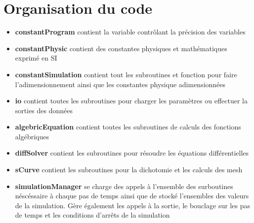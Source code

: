 \documentclass[a4paper,12pt]{article}
\begin{document}
    
\newpage
\section{Organisation du code}

\begin{itemize}
\item \textbf{constantProgram} contient la variable contrôlant la précision des variables
\item \textbf{constantPhysic} contient des constantes physiques et mathématiques exprimé en SI
\item \textbf{constantSimulation} contient tout les subroutines et fonction pour faire l’adimensionnement ainsi que les constantes physique adimensionnées
\item \textbf{io} contient toutes les subroutines pour charger les paramètres ou effectuer la sorties des données
\item \textbf{algebricEquation} contient toutes les subroutines de calculs des fonctions algébriques
\item \textbf{diffSolver} contient les subroutines pour résoudre les équations différentielles
\item \textbf{sCurve} contient les subroutines pour la dichotomie et les calculs des mesh
\item \textbf{simulationManager} se charge des appels à l'ensemble des surboutines néscéssaire à chaque pas de temps ainsi que de stocké l'ensembles des valeurs de la simulation. Gère également les appels à la sortie, le bouclage sur les pas de temps et les conditions d'arrêts de la simulation
\end{itemize}
\end{document}
